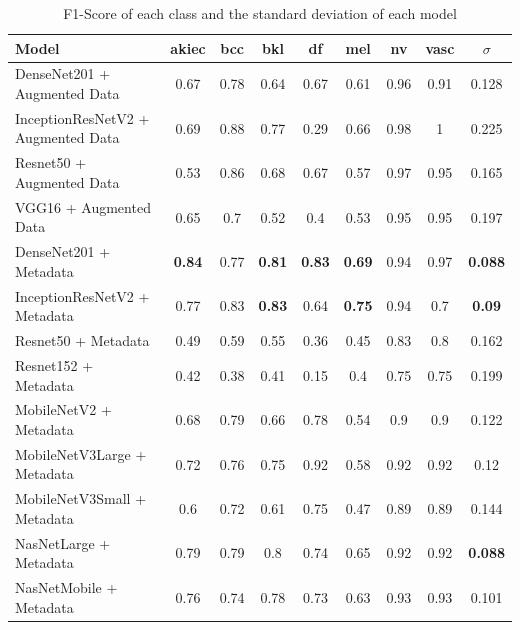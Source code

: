 \begin{table}[h]
	\centering
	\begin{tabular}{|l | c | c | c | c | c | c | c | c|} 
		\hline
		Model & akiec & bcc & bkl & df & mel & nv & vasc & $\sigma$ \\
		\hline
		DenseNet201 + Augmented Data & 0.67 & 0.78 & 0.64 & 0.67 & 0.61 & 0.96 & 0.91 & 0.128 \\ 
		\hline
		InceptionResNetV2 + Augmented Data & 0.69 &	0.88 & 0.77 & 0.29 & 0.66 & 0.98 & 1 & 0.225\\
		\hline
		Resnet50 + Augmented Data & 0.53 & 0.86 & 0.68 & 0.67 & 0.57 & 0.97 & 0.95 & 0.165\\
		\hline 	
		VGG16 + Augmented Data & 0.65 & 0.7 & 0.52 & 0.4 & 0.53 & 0.95 & 0.95 & 0.197\\ 
		\hline		
		DenseNet201 + Metadata & \textbf{0.84} & 0.77 & \textbf{0.81} & \textbf{0.83} & \textbf{0.69} & 0.94 & 0.97 & \textbf{0.088}\\
		\hline
		InceptionResNetV2 + Metadata & 0.77 & 0.83 & \textbf{0.83} & 0.64 & \textbf{0.75} & 0.94 & 0.7 & \textbf{0.09}\\
		\hline
		Resnet50 + Metadata & 0.49 & 0.59 & 0.55 & 0.36 & 0.45 & 0.83 & 0.8 & 0.162\\
		\hline
		Resnet152 + Metadata & 0.42 & 0.38 & 0.41 & 0.15 & 0.4 & 0.75 & 0.75 & 0.199\\
		\hline
		MobileNetV2 + Metadata & 0.68 & 0.79 & 0.66 & 0.78 & 0.54 & 0.9 & 0.9 & 0.122\\
		\hline
		MobileNetV3Large + Metadata & 0.72 & 0.76 & 0.75 & 0.92 & 0.58 & 0.92 & 0.92 & 0.12\\
		\hline
		MobileNetV3Small + Metadata & 0.6 & 0.72 & 0.61 & 0.75 & 0.47 & 0.89 & 0.89 & 0.144\\
		\hline
		NasNetLarge + Metadata & 0.79 & 0.79 & 0.8 & 0.74 & 0.65 & 0.92 & 0.92 & \textbf{0.088}\\
		\hline
		NasNetMobile + Metadata & 0.76 & 0.74 & 0.78 & 0.73 & 0.63 & 0.93 & 0.93 & 0.101\\
		\hline
	\end{tabular}
	\caption{F1-Score of each class and the standard deviation of each model}
	\label{table:5}
\end{table}\\
